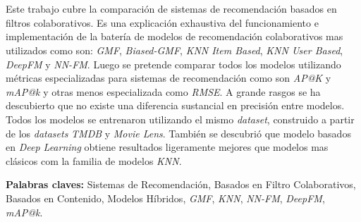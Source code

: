 \chapter*{\runtitulo}

\noindent Este trabajo cubre la comparación de sistemas de recomendación basados en filtros colaborativos. Es una explicación exhaustiva del funcionamiento e implementación de la batería de modelos de recomendación colaborativos mas utilizados como son: \textit{GMF}, \textit{Biased-GMF}, \textit{KNN Item Based}, \textit{KNN User Based}, \textit{DeepFM} y \textit{NN-FM}. Luego se pretende comparar todos los modelos utilizando métricas especializadas para sistemas de recomendación como son \textit{AP@K} y \textit{mAP@k} y otras menos especializada como \textit{RMSE}. A grande rasgos se ha descubierto que no existe una diferencia sustancial en precisión entre modelos. Todos los modelos se entrenaron utilizando el mismo \textit{dataset}, construido a partir de los \textit{datasets} \textit{TMDB} y \textit{Movie Lens}. También se descubrió que modelo basados en \textit{Deep Learning} obtiene resultados ligeramente mejores que modelos mas clásicos com la familia de modelos \textit{KNN}. 

\bigskip

\noindent\textbf{Palabras claves:} Sistemas de Recomendación, Basados en Filtro Colaborativos, Basados en Contenido, Modelos Híbridos, \textit{GMF}, \textit{KNN}, \textit{NN-FM}, \textit{DeepFM}, \textit{mAP@k}.
